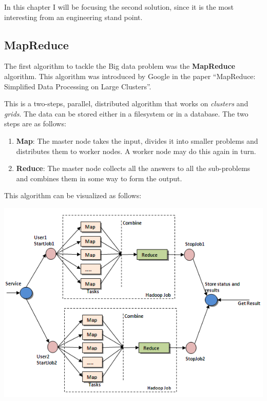 In this chapter I will be focusing the second solution, since it is the most
interesting from an engineering stand point.

\subsection{MapReduce}

The first algorithm to tackle the Big data problem was the {\bf MapReduce}
algorithm. This algorithm was introduced by Google in the paper ``MapReduce:
Simplified Data Processing on Large Clusters''.

This is a two-steps, parallel, distributed algorithm that works on {\it
clusters} and {\it grids}. The data can be stored either in a filesystem or in a
database. The two steps are as follows:

\begin{enumerate}
  \itemsep0em
  \item {\bf Map}: The master node takes the input, divides it into smaller
problems and distributes them to worker nodes. A worker node may do this again
in turn.
  \item {\bf Reduce}: The master node collects all the answers to all the
sub-problems and combines them in some way to form the output.
\end{enumerate}

This algorithm can be visualized as follows:

\begin{center}
  \includegraphics[scale=0.8]{overview/images/mapreduce.png}
\end{center}

